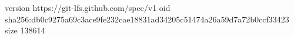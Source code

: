 version https://git-lfs.github.com/spec/v1
oid sha256:db0c9275a69c3ace9fe232cae18831ad34205c51474a26a59d7a72b0ccf33423
size 138614
